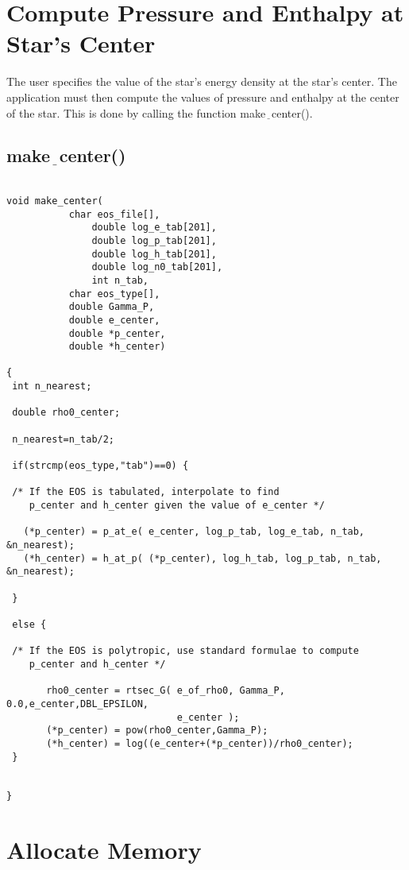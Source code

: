 \section{Compute Pressure and Enthalpy at Star's Center}

The user specifies the value of the star's energy density 
at the star's center. The application must then compute the 
values of pressure and enthalpy at the center of the star. 
This is done by calling the function make$\underline{\;\;}$center().

\subsection{make$\underline{\;\;}$center()}

\begin{verbatim}

void make_center(
	       char eos_file[], 
               double log_e_tab[201], 
               double log_p_tab[201], 
               double log_h_tab[201],
               double log_n0_tab[201], 
               int n_tab,                 
	       char eos_type[],
	       double Gamma_P, 
	       double e_center,
	       double *p_center, 
	       double *h_center)

{
 int n_nearest;

 double rho0_center;

 n_nearest=n_tab/2; 

 if(strcmp(eos_type,"tab")==0) {
 
 /* If the EOS is tabulated, interpolate to find 
    p_center and h_center given the value of e_center */

   (*p_center) = p_at_e( e_center, log_p_tab, log_e_tab, n_tab, &n_nearest);
   (*h_center) = h_at_p( (*p_center), log_h_tab, log_p_tab, n_tab, &n_nearest);

 }

 else {

 /* If the EOS is polytropic, use standard formulae to compute
    p_center and h_center */
	
       rho0_center = rtsec_G( e_of_rho0, Gamma_P, 0.0,e_center,DBL_EPSILON, 
                              e_center );
       (*p_center) = pow(rho0_center,Gamma_P);
       (*h_center) = log((e_center+(*p_center))/rho0_center);
 }


}

\end{verbatim}

\section{Allocate Memory}


